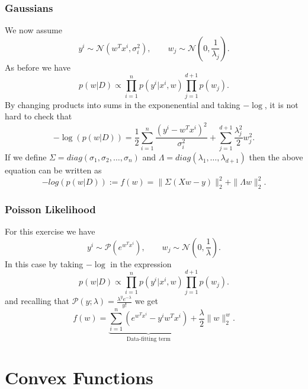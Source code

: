 \documentclass[11pt]{article}
\theoremstyle{plain}
\begin{document}
\subsubsection{Gaussians}
We now assume
\begin{equation*}
y^{i}\sim\mathcal{N}(w^{T}x^{i},\sigma_{i}^{2}),\qquad w_{j}\sim\mathcal{N}(0,\frac{1}{\lambda_{j}}).
\end{equation*}
As before we have
\begin{equation*}
p(w|D)\propto\prod_{i=1}^{n}p(y^{i}|x^{i},w)\prod_{j=1}^{d+1}p(w_{j}).
\end{equation*}
By changing products into sums in the exponenential and taking $-\log$, it is not hard
to check that 
\begin{equation*}
-\log(p(w|D))=\frac{1}{2}\sum_{i=1}^{n}\frac{(y^{i}-w^{T}x^{i})^{2}}{\sigma_{i}^{2}}+
\sum_{j=1}^{d+1}\frac{\lambda_{j}^{2}}{2}w_{j}^{2}.
\end{equation*}
If we define $\Sigma=diag(\sigma_{1},\sigma_{2},\ldots,\sigma_{n})$ and
$\Lambda=diag(\lambda_{1},\ldots,\lambda_{d+1})$ then the above equation can be written as
\begin{equation*}
-log(p(w|D)):=f(w)=\|\Sigma(Xw-y)\|_{2}^{2}+\|\Lambda w\|_{2}^{2}.
\end{equation*}

\subsubsection{Poisson Likelihood}
For this exercise we have
\begin{equation*}
y^{i}\sim\mathcal{P}(e^{w^{T}x^{i}}),\qquad w_{j}\sim\mathcal{N}(0,\frac{1}{\lambda}).
\end{equation*}
In this case by taking $-\log$ in the expression
\begin{equation*}
p(w|D)\propto\prod_{i=1}^{n}p(y^{i}|x^{i},w)\prod_{j=1}^{d+1}p(w_{j}).
\end{equation*}
and recalling that $\mathcal{P}(y;\lambda)=\frac{\lambda^{y}e^{-\lambda}}{y!}$ we get
\begin{equation*}
f(w)=\underbrace{\sum_{i=1}^{n}(e^{w^{T}x^{i}}-y^{i}w^{T}x^{i})}_{\text{Data-fitting term}}+
\frac{\lambda}{2}\|w\|_{2}^{w}.
\end{equation*}
\newpage
\section{Convex Functions}
\end{document}
